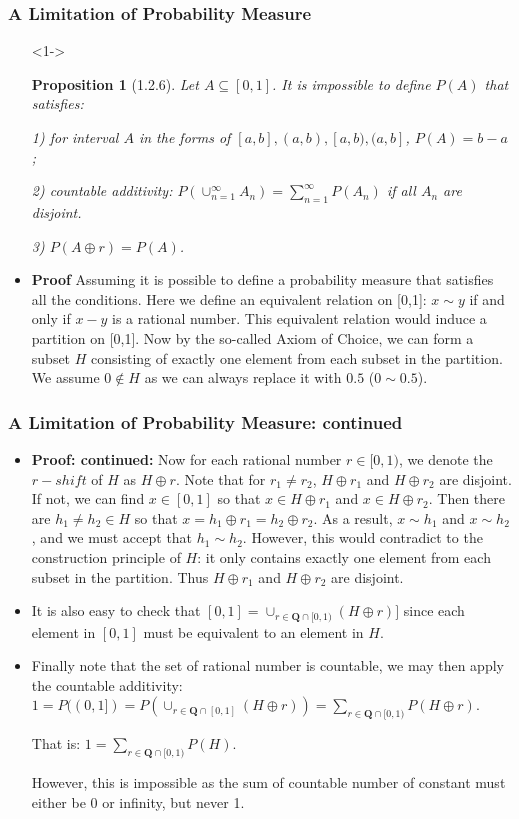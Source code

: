 \documentclass[handout]{beamer}
\newtheorem{Proposition}[theorem]{Proposition}
\begin{document}
\frame
{
  \frametitle{A Limitation of Probability Measure}

   \begin{itemize}

      
   \item[]<1-> \begin{Proposition}[1.2.6] Let $A \subseteq [0,1]$. It is impossible to define $P(A)$ that satisfies:  
   
   1) for interval $A$ in the forms of $[a,b], (a,b), [a,b),(a, b]$, $P( A)=b-a$; 
   
   2) countable additivity: $P(\cup_{n=1}^{\infty} A_n)=\sum_{n=1}^{\infty} P(A_n)$ if all $A_n$ are disjoint. 
   
   3) $P(A\oplus r)=P(A)$. \end{Proposition} 
      \item<2->\textbf{Proof} Assuming it is possible to define a probability measure that satisfies all the conditions. Here we define an equivalent relation on [0,1]: $x\sim y$ if and only if  $x-y$ is a rational number. This equivalent relation would induce a partition on [0,1]. Now by the so-called Axiom of Choice, we can form a subset $H$ consisting of exactly one element from each subset in the partition. We assume $0\not\in H$ as we can always replace it with $0.5$ ($0\sim 0.5$). 
       
  \end{itemize}
}


\frame
{
  \frametitle{A Limitation of Probability Measure: continued}

   \begin{itemize}

      
       \item<1->\textbf{Proof: continued:} Now for each rational number $r\in [0,1)$, we denote the $r-shift$ of $H$ as $H\oplus r$. Note that for $r_1\neq r_2$, $H\oplus r_1$ and $H\oplus r_2$ are disjoint. If not, we can find $x\in [0,1]$ so that $x\in H\oplus r_1$ and $x\in H\oplus r_2$. Then there are $h_1\neq  h_2 \in H$ so that $x=h_1\oplus r_1=h_2\oplus r_2$. As a result, $x\sim h_1$ and  $x\sim h_2$, and we must accept that $h_1\sim h_2$. However, this would contradict to the construction principle of $H$: it only contains exactly one element from each subset in the partition.  Thus $H\oplus r_1$ and $H\oplus r_2$ are disjoint.
      \item<2->It is also easy to check that $[0,1]=\cup_{r \in \mathbf{Q} \cap [0,1) } (H\oplus r)]$ since each element in $[0,1]$ must be equivalent to an element in $H$. 
      
      \item<3->Finally note that the set of rational number is countable,  we may then apply the countable additivity: $1=P((0,1])=P(\cup_{r \in \mathbf{Q} \cap [0,1] } (H\oplus r) )=\sum_{r \in \mathbf{Q} \cap [0,1) } P(H\oplus r)$. 
      
      That is: $1=\sum_{r \in \mathbf{Q} \cap [0,1) } P(H)$. 
      
      However, this is impossible as the sum of countable number of constant must either be 0 or infinity, but never 1. 
             
  \end{itemize}
}
\end{document}
